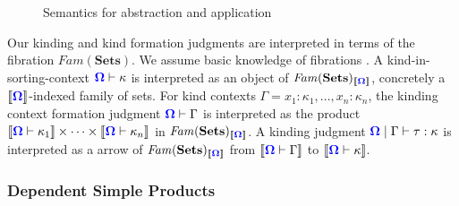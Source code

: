 \documentclass[sigplan,10pt,review,anonymous]{acmart}
\newcommand{\blum}[1]{\mathbf{\color{blue}{#1}}}
\newcommand{\defeq}{\overset{\mathit{def}}{=}}
\newcommand{\sem}[1]{\llbracket #1 \rrbracket}
\newcommand{\mbf}[1]{\mathbf{#1}}
\begin{document}
\begin{figure}

\caption{Semantics for abstraction and application}
\end{figure}

Our kinding and kind formation judgments are interpreted in terms of the fibration $\mathit{Fam}(\mbf{Sets})$. We assume basic knowledge of fibrations \cite{jacobs1999categorical}. A kind-in-sorting-context $\blum{\Omega} \vdash \kappa$ is interpreted as an object of $\mathit{Fam}(\mbf{Sets})_{\sem{\blum{\Omega}}}$, concretely a $\sem{\blum{\Omega}}$-indexed family of sets. For kind contexts $\Gamma = x_1:\kappa_1,\ldots,x_n : \kappa_n$, the kinding context formation judgment $\blum{\Omega} \vdash \Gamma$ is interpreted as the product $\sem{\blum{\Omega} \vdash \kappa_1} \times \cdots \times \sem{\blum{\Omega} \vdash \kappa_n}$ in $\mathit{Fam}(\mbf{Sets})_{\sem{\blum{\Omega}}}$. A kinding judgment $\blum{\Omega} \mid \Gamma \vdash \tau : \kappa$ is interpreted as a arrow of $\mathit{Fam}(\mbf{Sets})_{\sem{\blum{\Omega}}}$ from $\sem{\blum{\Omega} \vdash \Gamma}$ to $\sem{\blum{\Omega} \vdash \kappa}$. 

\subsubsection{Dependent Simple Products}
\end{document}
